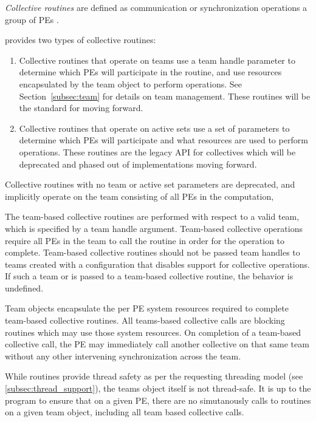 \emph{Collective routines} are defined as  communication or synchronization
operations   a group of \acp{PE} .

{\color{Green}
\openshmem provides two types of collective routines:

\begin{enumerate}
\item Collective routines that operate on teams use a team handle parameter to determine
which \acp{PE} will participate in the routine, and use resources encapsulated by the team object
to perform operations. See Section~\ref{subsec:team} for details on team management.
These routines will be the standard for \openshmem moving forward.
\item Collective routines that operate on active sets use a set of parameters to determine
which \acp{PE} will participate and what resources are used to perform operations. These routines
are the legacy API for collectives which will be deprecated and phased out of
implementations moving forward.
\end{enumerate}

Collective routines with no team or active set parameters are deprecated,
and implicitly operate on the team consisting of all \acp{PE} in the computation,

The team-based collective routines are performed with respect to a valid
\openshmem team, which is specified by a team handle argument.
Team-based collective operations require all \acp{PE} in the team to call
the routine in order for the operation to complete. Team-based collective routines
should not be passed team handles to teams created with a configuration
that disables support for collective operations. If such a team
or  is passed to a team-based collective
routine, the behavior is undefined.

Team objects encapsulate the per \ac{PE} system resources required to complete
team-based collective routines.
All \openshmem teams-based collective calls are blocking routines which may use those
system resources. On completion of a team-based collective call, the \ac{PE} may
immediately call another collective on that same team without any other intervening
synchronization across the team.

While \openshmem routines provide thread safety as per the requesting threading model
(see \ref{subsec:thread_support}), the teams object itself is not thread-safe. It is up
to the program to ensure that on a given \ac{PE}, there are no simutanously calls to routines
on a given team object, including all team based collective calls.

}
